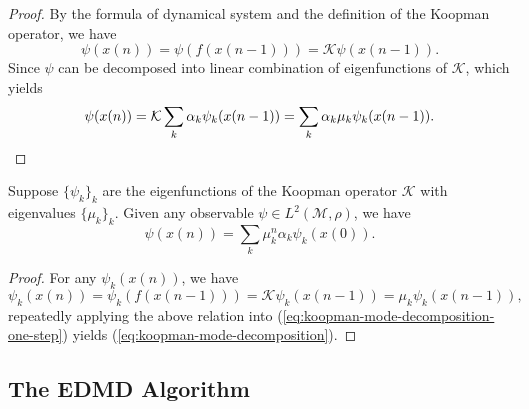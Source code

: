 \documentclass[en, bibend=bibtex]{elegantpaper}
\theoremstyle{plain}
\begin{document}
\begin{proof}
  By the formula of dynamical system and
  the definition of the Koopman operator,
  we have
  \begin{equation*}
  \psi(x(n)) = \psi(f(x(n-1))) = \mathcal{K} \psi(x(n-1)).
  \end{equation*}
  Since $\psi$ can be decomposed into linear combination of
  eigenfunctions of $\mathcal{K}$, which yields
  \begin{equation*}
    \psi(x(n)) = \mathcal{K} \sum\limits_k \alpha_k \psi_k(x(n-1))
    = \sum\limits_k \alpha_k \mu_k \psi_k(x(n-1)).  \qedhere
  \end{equation*}
\end{proof}

\begin{corollary}
  Suppose $\{\psi_k\}_k$ are the eigenfunctions of
  the Koopman operator $\mathcal{K}$
  with eigenvalues $\{\mu_k\}_k$.
  Given any observable $\psi \in L^2(\mathcal{M}, \rho)$,
  we have
  \begin{equation}
    \label{eq:koopman-mode-decomposition}
    \psi(x(n)) = \sum\limits_k \mu_k^n \alpha_k \psi_k(x(0)).
  \end{equation}
\end{corollary}

\begin{proof}
  For any $\psi_k(x(n))$, we have
  \begin{equation*}
    \psi_k(x(n)) = \psi_k(f(x(n-1)))
    = \mathcal{K}\psi_k(x(n-1))
    = \mu_k\psi_k(x(n-1)),
  \end{equation*}
  repeatedly applying the above relation into (\ref{eq:koopman-mode-decomposition-one-step})
  yields (\ref{eq:koopman-mode-decomposition}).
\end{proof}

\subsection{The EDMD Algorithm}
\end{document}
